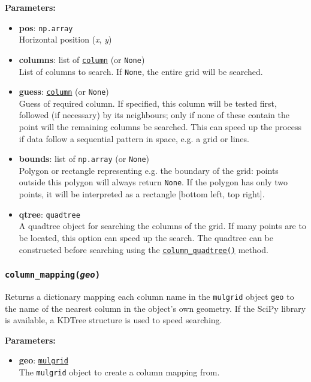 \textbf{Parameters:}
\begin{itemize}
\item \textbf{pos}: \texttt{np.array}\\
  Horizontal position (\emph{x}, \emph{y})
\item \textbf{columns}: list of \hyperref[columnobjects]{\texttt{column}} (or \texttt{None})\\
  List of columns to search.  If \texttt{None}, the entire grid will be searched.
\item \textbf{guess}: \hyperref[columnobjects]{\texttt{column}} (or \texttt{None})\\
  Guess of required column.  If specified, this column will be tested first, followed (if necessary) by its neighbours; only if none of these contain the point will the remaining columns be searched.  This can speed up the process if data follow a sequential pattern in space, e.g. a grid or lines.
 \item \textbf{bounds}: list of \texttt{np.array} (or \texttt{None})\\
  Polygon or rectangle representing e.g. the boundary of the grid: points outside this polygon will always return \texttt{None}.  If the polygon has only two points, it will be interpreted as a rectangle [bottom left, top right].
 \item \textbf{qtree}: \texttt{quadtree} \\
   A quadtree object for searching the columns of the grid.  If many points are to be located, this option can speed up the search.  The quadtree can be constructed before searching using the \hyperref[sec:mulgrid:column_quadtree]{\texttt{column\_quadtree()}} method.
\end{itemize}

\begin{snugshade}\subsubsection{\texttt{column\_mapping(\emph{geo})}}\end{snugshade}
\label{sec:mulgrid:column_mapping}

Returns a dictionary mapping each column name in the \texttt{mulgrid} object \texttt{geo} to the name of the nearest column in the object's own geometry.  If the SciPy library is available, a KDTree structure is used to speed searching.

\textbf{Parameters:}
\begin{itemize}
\item \textbf{geo}: \hyperref[mulgrids]{\texttt{mulgrid}}\\
  The \texttt{mulgrid} object to create a column mapping from.
\end{itemize}


